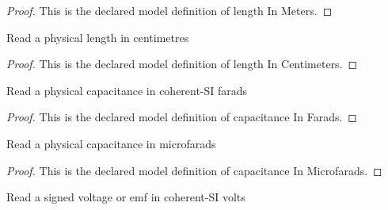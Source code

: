 \begin{proof}
  This is the declared model definition of length In Meters.
\end{proof}
\begin{definition}
  \label{def:physics:phyx-mini-0974:phyxminiproblems-problemphyxmini0974-lengthincentimeters}
  Read a physical length in centimetres
\end{definition}
\begin{proof}
  This is the declared model definition of length In Centimeters.
\end{proof}
\begin{definition}
  \label{def:physics:phyx-mini-0974:phyxminiproblems-problemphyxmini0974-capacitanceinfarads}
  Read a physical capacitance in coherent-SI farads
\end{definition}
\begin{proof}
  This is the declared model definition of capacitance In Farads.
\end{proof}
\begin{definition}
  \label{def:physics:phyx-mini-0974:phyxminiproblems-problemphyxmini0974-capacitanceinmicrofarads}
  Read a physical capacitance in microfarads
\end{definition}
\begin{proof}
  This is the declared model definition of capacitance In Microfarads.
\end{proof}
\begin{definition}
  \label{def:physics:phyx-mini-0974:phyxminiproblems-problemphyxmini0974-voltageinvolts}
  Read a signed voltage or emf in coherent-SI volts
\end{definition}
